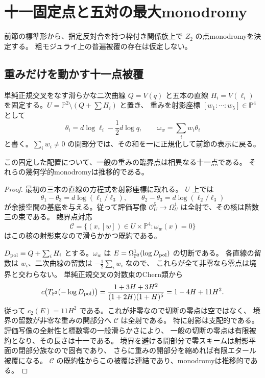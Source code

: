 \section{十一固定点と五対の最大monodromy}
\label{sec:master-monodromy-v25}

前節の標準形から、指定反対合を持つ枠付き関係族上で $Z_2$ の点monodromyを決定する。
粗モジュライ上の普遍被覆の存在は仮定しない。

\subsection{重みだけを動かす十一点被覆}

単純正規交叉をなす滑らかな二次曲線 $Q=V(q)$ と五本の直線
$H_i=V(\ell_i)$ を固定する。$U=\mathbb P^2\setminus(Q+\sum H_i)$ と置き、
重みを射影座標 $[w_1:\cdots:w_5]\in\mathbb P^4$ として
\[
 \theta_i=d\log\ell_i-\frac12d\log q,\qquad
 \omega_w=\sum_iw_i\theta_i
\]
と書く。$\sum_iw_i\ne0$ の開部分では、その和を一に正規化して前節の表示に戻る。

\begin{lemma}[臨界点対応の既約性と次数]
\label{lem:master-transitive-v25}
この固定した配置について、一般の重みの臨界点は相異なる十一点である。
それらの幾何学的monodromyは推移的である。
\end{lemma}
\begin{proof}
最初の三本の直線の方程式を射影座標に取れる。
$U$ 上では
\[
 \theta_1-\theta_3=d\log(\ell_1/\ell_3),\qquad
 \theta_2-\theta_3=d\log(\ell_2/\ell_3)
\]
が余接空間の基底を与える。従って評価写像
$\mathcal O_U^5\to\Omega_U^1$ は全射で、その核は階数三の束である。
臨界点対応
\[
 \mathcal C=\{(x,[w])\in U\times\mathbb P^4:\omega_w(x)=0\}
\]
はこの核の射影束なので滑らかかつ既約である。

$D_{\rm pol}=Q+\sum_iH_i$ とする。$\omega_w$ は
$E=\Omega_{\mathbb P^2}^1(\log D_{\rm pol})$ の切断である。
各直線の留数は $w_i$、二次曲線の留数は $-\frac12\sum_iw_i$ なので、
これらが全て非零なら零点は境界と交わらない。
単純正規交叉の対数束のChern類から
\[
 c\bigl(T_{\mathbb P^2}(-\log D_{\rm pol})\bigr)
 =\frac{1+3H+3H^2}{(1+2H)(1+H)^5}
 =1-4H+11H^2.
\]
従って $c_2(E)=11H^2$ である。これが非零なので切断の零点は空ではなく、
境界の留数が非零な重みの開部分へ $\mathcal C$ は全射である。
特に射影は支配的である。
評価写像の全射性と標数零の一般滑らかさにより、
一般の切断の零点は有限被約となり、その長さは十一である。
境界を避ける開部分で零スキームは射影平面の閉部分族なので固有であり、
さらに重みの開部分を縮めれば有限エタール被覆になる。
$\mathcal C$ の既約性からこの被覆は連結であり、monodromyは推移的である。
\end{proof}

